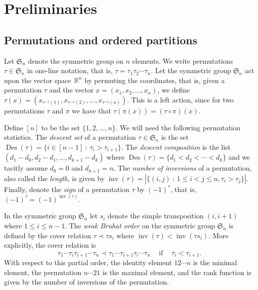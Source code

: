 \documentclass[ALCO,ThmDefs,Unicode,epreuves]{cedram}
\newcommand{\Rrr}{\mathbb{R}}
\newcommand{\Sym}{\mathfrak{S}}
\DeclareMathOperator{\Des}{Des}
\DeclareMathOperator{\inv}{inv}
\newcommand{\coveredby}{\prec}
\begin{document}
\section{Preliminaries}
\label{section_preliminaries}

\subsection{Permutations and ordered partitions}

Let $\Sym_{n}$ denote the symmetric group on $n$ elements.
We write permutations $\tau \in \Sym_{n}$ in one-line notation, that is,
$\tau = \tau_{1} \tau_{2} \cdots \tau_{n}$.
Let the symmetric group $\Sym_{n}$ act upon the
vector space~$\Rrr^{n}$ by permuting the coordinates,
that is,
given a permutation $\tau$
and the vector $x = (x_{1}, x_{2}, \ldots, x_{n})$,
we define
$\tau(x) = (x_{\tau^{-1}(1)}, x_{\tau^{-1}(2)}, \ldots, x_{\tau^{-1}(n)})$.
This is a left action, since
for two permutations $\tau$ and $\pi$ we have that
$\tau(\pi(x)) = (\tau \circ \pi)(x)$.

Define $[n]$ to be the set $\{1,2, \ldots, n\}$.
We will need the following permutation statistics.
The \emph{descent set} of a permutation $\tau \in \Sym_{n}$
is the set
$\Des(\tau) = \{i \in [n-1] \: : \: \tau_{i} > \tau_{i+1}\}$.
The \emph{descent composition} is the list
$(d_{1}-d_{0}, d_{2}-d_{1}, \ldots, d_{k+1}-d_{k})$
where $\Des(\tau) = \{d_{1} < d_{2} < \cdots < d_{k}\}$
and we tacitly assume $d_{0} = 0$ and $d_{k+1} = n$.
The \emph{number of inversions} of a permutation, also called the
\emph{length},
is given by
$\inv(\tau) = |\{(i,j) \: : \: 1 \leq i < j \leq n, \tau_{i} > \tau_{j}\}|$.
Finally, denote the \emph{sign} of a permutation $\tau$ by
$(-1)^{\tau}$, that is,
$(-1)^{\tau} = (-1)^{\inv(\tau)}$.

In the symmetric group $\Sym_{n}$
let $s_{i}$ denote the simple transposition $(i,i+1)$
where $1 \leq i \leq n-1$.
The \emph{weak Bruhat order} on the symmetric group $\Sym_{n}$
is defined by the cover relation
$\tau \coveredby \tau s_{i}$ where
$\inv(\tau) < \inv(\tau s_{i})$.
More explicitly, the cover relation is
$$
\tau_{1} \cdots \tau_{i} \tau_{i+1} \cdots \tau_{n}
\coveredby
\tau_{1} \cdots \tau_{i+1} \tau_{i} \cdots \tau_{n}
\:\:\:\:
\text{ if }
\:\:\:\:
\tau_{i} < \tau_{i+1} .
$$
With respect to this partial order,
the identity element $12 \cdots n$ is the minimal element,
the permutation $n \cdots 21$ is the maximal element,
and the rank function is given by the number of inversions
of the permutation.
\end{document}
